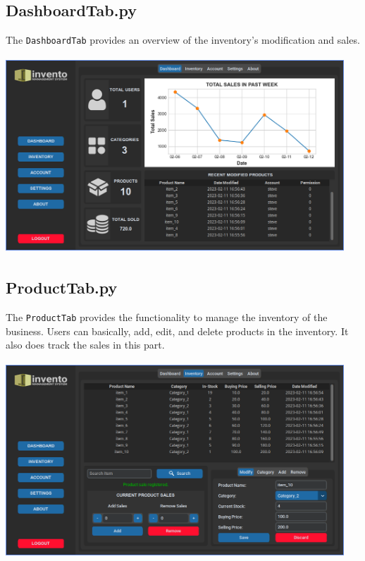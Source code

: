 \documentclass[12pt,a4paper]{article}
\renewcommand{\indent}{\hspace\parindent}
\begin{document}
        \subsection*{\normalfont{\faCode{}} \textbf{DashboardTab.py}}

            \indent The \texttt{DashboardTab} provides an overview of the 
            inventory's modification and sales. 

            \begin{center}
                \includegraphics[width=5in,height=2.9in]{Dashboard.png}
            \end{center}

        \subsection*{\normalfont{\faCode{}} \textbf{ProductTab.py}}

            \indent The \texttt{ProductTab} provides the functionality to manage the 
            inventory of the business. Users can basically, add, edit, and delete 
            products in the inventory. It also does track the sales in this part.

            \begin{center}
                \includegraphics[width=5in,height=2.9in]{Inventory.png}
            \end{center}
\end{document}
